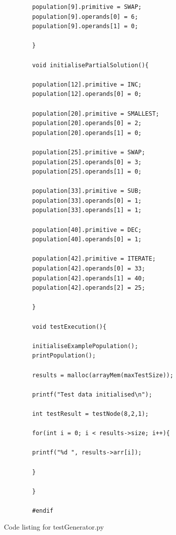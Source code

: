 \documentclass{article}
\begin{document}
\begin{lstlisting}
	    population[9].primitive = SWAP;
	    population[9].operands[0] = 6;
	    population[9].operands[1] = 0;
	    
	    }
	    
	    void initialisePartialSolution(){
	    
	    population[12].primitive = INC;
	    population[12].operands[0] = 0;
	    
	    population[20].primitive = SMALLEST;
	    population[20].operands[0] = 2;
	    population[20].operands[1] = 0;
	    
	    population[25].primitive = SWAP;
	    population[25].operands[0] = 3;
	    population[25].operands[1] = 0;
	    
	    population[33].primitive = SUB;
	    population[33].operands[0] = 1;
	    population[33].operands[1] = 1;
	    
	    population[40].primitive = DEC;
	    population[40].operands[0] = 1;
	    
	    population[42].primitive = ITERATE;
	    population[42].operands[0] = 33;
	    population[42].operands[1] = 40;
	    population[42].operands[2] = 25;
	    
	    }
	    
	    void testExecution(){
	    
	    initialiseExamplePopulation();
	    printPopulation();
	    
	    results = malloc(arrayMem(maxTestSize));
	    
	    printf("Test data initialised\n");
	    
	    int testResult = testNode(8,2,1);
	    
	    for(int i = 0; i < results->size; i++){
	    
	    printf("%d ", results->arr[i]);
	    
	    }
	    
	    }
	    
	    #endif
	    \end{lstlisting}
	    
	    Code listing for testGenerator.py
	    
\end{document}
